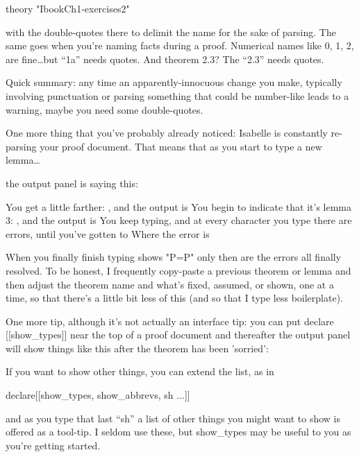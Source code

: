 theory "IbookCh1-exercises2"

with the double-quotes there to delimit the name for the sake of parsing. The same goes when you're naming facts during a proof. Numerical names like 0, 1, 2, are fine\ldots but ``1a'' needs quotes. And theorem 2.3? The ``2.3'' needs quotes. 

Quick summary: any time an apparently-innocuous change you make, typically involving punctuation or parsing something that could be number-like leads to a warning, maybe you need some double-quotes.

One more thing that you've probably already noticed: Isabelle is constantly re-parsing your proof document. That means that as you start to type a new lemma\ldots

the output panel is saying this:

You get a little farther: , and the output is 
You begin to indicate that it's lemma 3: , and the output is 
You keep typing, and at every character you type there are errors, until you've gotten to 
Where the error is 

When you finally finish typing 
shows "P=P"
only then are the errors all finally resolved. To be honest, I frequently copy-paste a previous theorem or lemma and then adjust the theorem name and what's fixed, assumed, or shown, one at a time, so that there's a little bit less of this (and so that I type less boilerplate). 

One more tip, although it's not actually an interface tip: you can put 
declare [[show_types]]
near the top of a proof document and thereafter the output panel will show things like this after the  theorem has been 'sorried':

If you want to show other things, you can extend the list, as in 

declare[[show_types, show_abbrevs, sh ...]]

and as you type that last ``sh'' a list of other things you might want to show is offered as a tool-tip. I seldom use these, but show_types may be useful to you as you're getting started. 

